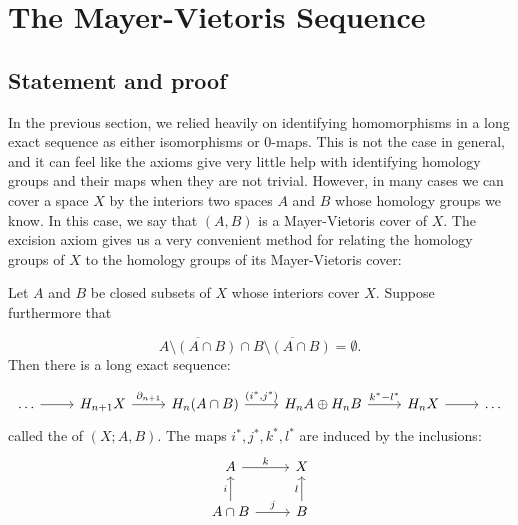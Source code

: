 \section{The Mayer-Vietoris Sequence}\label{sec-mayer-vietoris}
\subsection{Statement and proof}
In the previous section, we relied heavily on identifying homomorphisms in a long exact sequence as either isomorphisms or $0$-maps. This is not the case in general, and it can feel like the axioms give very little help with identifying homology groups and their maps when they are not trivial. However, in many cases we can cover a space $X$ by the interiors two spaces $A$ and $B$ whose homology groups we know. In this case, we say that $(A,B)$ is a Mayer-Vietoris cover of $X$. The excision axiom gives us a very convenient method for relating the homology groups of $X$ to the homology groups of its Mayer-Vietoris cover:

\begin{theorem}\label{mayer-vietoris}
Let $A$ and $B$ be closed subsets of $X$ whose interiors cover $X$. Suppose furthermore that  


$$\overline{A\setminus(A\cap B)}\cap \overline{B\setminus(A\cap B)}=\emptyset.$$
Then there is a long exact sequence:

\[\begin{tikzcd}
\dots \arrow[r] & H_{n+1}X \arrow[r, "\partial_{n+1}"] & H_n(A\cap B) \arrow[r, "{(i^*,j^*)}"] & H_n A \dsum H_n B \arrow[r, "k^*-l^*"] & H_n X \arrow[r] & \dots
\end{tikzcd}\]
called the  of $(X;A,B)$. The maps $i^*,j^*,k^*,l^*$ are induced by the inclusions:
\[\begin{tikzcd}
A \arrow[r, "k"]                      & X                \\
A\cap B \arrow[u, "i"] \arrow[r, "j"] & B \arrow[u, "l"]
\end{tikzcd}\]
\end{theorem}


